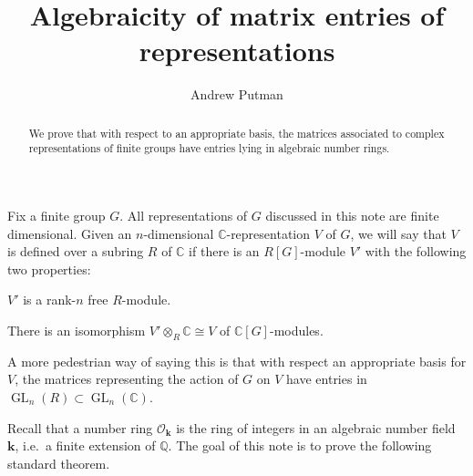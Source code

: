 \documentclass[11pt]{article}
\title{\vspace{-50pt}Algebraicity of matrix entries of representations}
\author{Andrew Putman\vspace{-6pt}}
\date{}
\numberwithin{equation}{section}
\theoremstyle{plain}
\theoremstyle{definition}
\DeclareMathOperator{\GL}{GL}
\newcommand\C{\ensuremath{\mathbb{C}}}
\newcommand\Q{\ensuremath{\mathbb{Q}}}
\newcommand\bk{\ensuremath{\mathbf{k}}}
\newcommand\cO{\ensuremath{\mathcal{O}}}
\begin{document}
\maketitle

\begin{abstract}
We prove that with respect to an appropriate basis, the matrices associated
to complex representations of finite groups have entries lying in algebraic
number rings.  
\end{abstract}

Fix a finite group $G$.  All representations of $G$ discussed in this note are
finite dimensional.  Given an $n$-dimensional $\C$-representation $V$ of $G$, we will
say that $V$ is defined over a subring $R$ of $\C$ if there is an
$R[G]$-module $V'$ with the following two properties:
\begin{compactitem}
\item $V'$ is a rank-$n$ free $R$-module.
\item There is an isomorphism $V' \otimes_R \C \cong V$ of $\C[G]$-modules.
\end{compactitem}
A more pedestrian way of saying this is that with respect an appropriate
basis for $V$, the matrices representing the action of $G$ on $V$
have entries in $\GL_n(R) \subset \GL_n(\C)$.

Recall that a number ring $\cO_{\bk}$ is the ring of integers in an algebraic
number field $\bk$, i.e.\ a finite extension of $\Q$.  The goal of this note
is to prove the following standard theorem.
\end{document}
